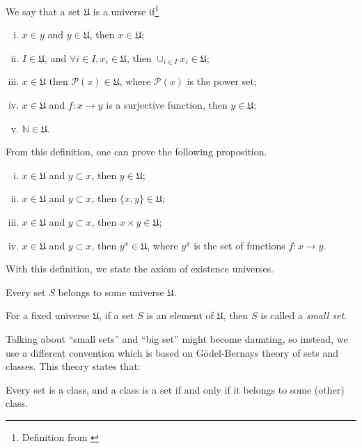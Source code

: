 \begin{definition}[Universe]
  We say that a set $\mathfrak U$ is a universe if\footnote{Definition from \citet{borceux1994handbook}}
  \begin{enumerate}[(i)]
    \item $x\in y$ and $ y\in \mathfrak U$, then $x \in \mathfrak U$;
    \item $I \in \mathfrak U$, and $\forall i \in I, x_i \in \mathfrak U$, then $\cup_{i\in I}x_i \in \mathfrak U$;
    \item $x \in \mathfrak U$ then $\mathcal P(x) \in \mathfrak U$, where $\mathcal P(x)$ is the power set;
    \item $x \in \mathfrak U$ and $f:x\to y$ is a surjective function, then $y \in \mathfrak U$;
    \item $\mathbb N \in \mathfrak U$.
  \end{enumerate}
\end{definition}

From this definition, one can prove the following proposition.
\begin{proposition}
  \begin{enumerate}[(i)]
    \item $x \in \mathfrak U$ and $y \subset x$, then $y \in \mathfrak U$;
    \item $x \in \mathfrak U$ and $y \subset x$, then $\{x,y\} \in \mathfrak U$;
    \item $x \in \mathfrak U$ and $y \subset x$, then $x\times y \in \mathfrak U$;
    \item $x \in \mathfrak U$ and $y \subset x$, then $y^x \in \mathfrak U$, where $y^x$ is the set of functions $f:x \to y$.
  \end{enumerate}
  \label{prop:universe}
\end{proposition}

With this definition, we state the axiom of existence universes.
\begin{axiom}
  Every set $S$ belongs to some universe $\mathfrak U$.
\end{axiom}

\begin{definition}
  For a fixed universe $\mathfrak U$, if a set $S$ is an element of $\mathfrak U$,
  then $S$ is called a \textit{small set}.
\end{definition}

Talking about ``small sets'' and ``big set'' might become daunting, so instead, we
use a different convention which is based on Gödel-Bernays theory of sets and classes.
This theory states that:
\begin{axiom}
  Every set is a class, and a class is a set if and only if it belongs to some (other)
  class.
\end{axiom}

